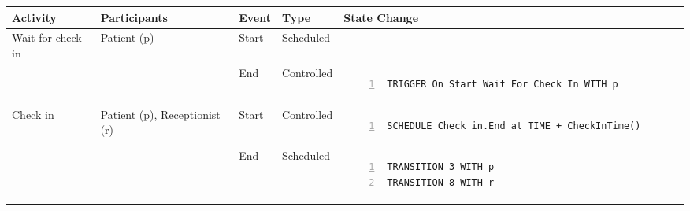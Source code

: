 \begin{tabular}{@{}>{\raggedright\arraybackslash}p{1.5cm}>{\raggedright\arraybackslash}p{2cm}>{\raggedright\arraybackslash}p{0.9cm}>{\raggedright\arraybackslash}p{2.2cm}>{\raggedright\arraybackslash}p{8cm}@{}}
\toprule
Activity          & Participants & Event & Type       & State Change \\ \midrule
Wait for check in & Patient (p)  & Start & Scheduled  &              \\
                  &              & End   & Controlled &
\vspace{-12pt}
\begin{Verbatim}[numbers=left]
TRIGGER On Start Wait For Check In WITH p
\end{Verbatim}
\\ \midrule
Check in & Patient (p), Receptionist (r)  & Start & Controlled  & 
\vspace{-12pt}
\begin{Verbatim}[numbers=left]
SCHEDULE Check in.End at TIME + CheckInTime()
\end{Verbatim}
\\
                  &              & End   & Scheduled &
\vspace{-12pt}
\begin{Verbatim}[numbers=left]
TRANSITION 3 WITH p
TRANSITION 8 WITH r
\end{Verbatim}          
\\ \bottomrule
\end{tabular}